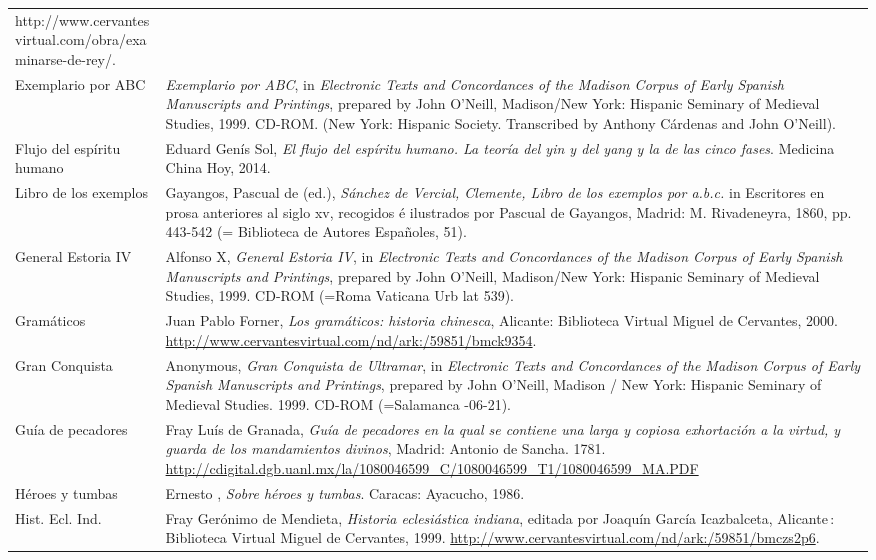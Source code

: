 \documentclass[output=paper]{langscibook}
\begin{document}
\begin{tabularx}{\textwidth}{XX}
http://www.cervantesvirtual.com/obra/examinarse-de-rey/.\\
Exemplario por ABC  & \textit{Exemplario por ABC}, in \textit{Electronic Texts and Concordances of the Madison Corpus of Early Spanish Manuscripts and Printings}, prepared by John O’Neill, Madison/New York: Hispanic Seminary of Medieval Studies, 1999. CD-ROM. (New York: Hispanic Society. Transcribed by Anthony Cárdenas and John O'Neill).\\
Flujo del espíritu humano & Eduard Genís Sol, \textit{El flujo del espíritu humano. La teoría del yin y del yang y la de las cinco fases}. Medicina China Hoy, 2014.\\
Libro de los exemplos & Gayangos, Pascual de (ed.), \textit{Sánchez de Vercial, Clemente, Libro de los exemplos por a.b.c.} in Escritores en prosa anteriores al siglo xv, recogidos é ilustrados por Pascual de Gayangos, Madrid: M. Rivadeneyra, 1860, pp. 443-542 (= Biblioteca de Autores Españoles, 51).\\
General Estoria IV & Alfonso X, \textit{General Estoria IV}, in \textit{Electronic Texts and Concordances of the Madison Corpus of Early Spanish Manuscripts and Printings}, prepared by John O’Neill, Madison/New York: Hispanic Seminary of Medieval Studies, 1999. CD-ROM (=Roma Vaticana Urb lat 539).\\
Gramáticos & Juan Pablo Forner, \textit{Los gramáticos: historia chinesca}, Alicante: Biblioteca Virtual Miguel de Cervantes, 2000. \url{http://www.cervantesvirtual.com/nd/ark:/59851/bmck9354}.\\
Gran Conquista & Anonymous, \textit{Gran Conquista de Ultramar}, in \textit{Electronic Texts and Concordances of the Madison Corpus of Early Spanish Manuscripts and Printings}, prepared by John O’Neill, Madison / New York: Hispanic Seminary of Medieval Studies. 1999. CD-ROM (=Salamanca \citealt{Giesser1503}-06-21).\\
Guía de pecadores & Fray Luís de Granada, \textit{Guía de pecadores en la qual se contiene una larga y copiosa exhortación a la virtud, y guarda de los mandamientos divinos}, Madrid: Antonio de Sancha. 1781. \url{http://cdigital.dgb.uanl.mx/la/1080046599_C/1080046599_T1/1080046599_MA.PDF}\\
Héroes y tumbas & Ernesto \citet{Sábato1961}, \textit{Sobre héroes y tumbas}. Caracas: Ayacucho, 1986.\\
Hist. Ecl. Ind. & Fray Gerónimo de Mendieta, \textit{Historia eclesiástica indiana}, editada por Joaquín García Icazbalceta, Alicante : Biblioteca Virtual Miguel de Cervantes, 1999. \url{http://www.cervantesvirtual.com/nd/ark:/59851/bmczs2p6}.\\

\end{tabularx}
\end{document}
